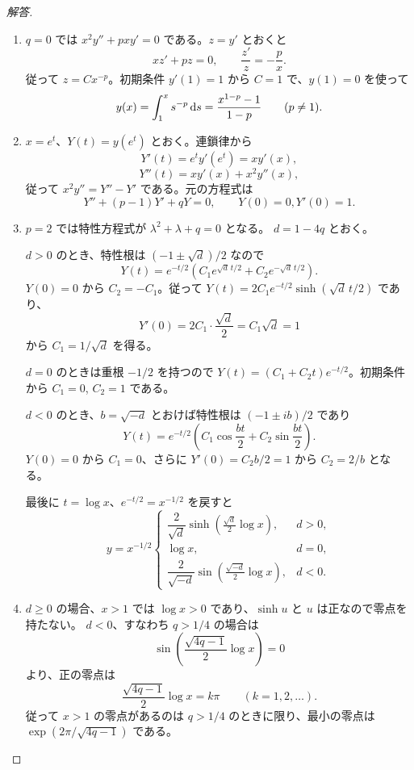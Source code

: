 \begin{proof}[解答]
\begin{enumerate}
\item[(1)] $q=0$ では $x^2y''+pxy'=0$ である。$z=y'$ とおくと
\[
xz'+pz=0,\qquad \frac{z'}z=-\frac px.
\]
従って $z=Cx^{-p}$。初期条件 $y'(1)=1$ から $C=1$ で、$y(1)=0$ を使って
\[
y(x)=\int_1^x s^{-p}\,\mathrm{d} s=\frac{x^{1-p}-1}{1-p}\qquad(p\ne1).
\]

\item[(2)] $x=e^t$、$Y(t)=y(e^t)$ とおく。連鎖律から
\[
Y'(t)=e^ty'(e^t)=xy'(x),
\]
\[
Y''(t)=xy'(x)+x^2y''(x),
\]
従って $x^2y''=Y''-Y'$ である。元の方程式は
\[
Y''+(p-1)Y'+qY=0,\qquad Y(0)=0, Y'(0)=1.
\]
\item[(3)] $p=2$ では特性方程式が $\lambda^2+\lambda+q=0$ となる。
$d=1-4q$ とおく。

$d>0$ のとき、特性根は $(-1\pm\sqrt d)/2$ なので
\[
Y(t)=e^{-t/2}\left(C_1e^{\sqrt d\,t/2}+C_2e^{-\sqrt d\,t/2}\right).
\]
$Y(0)=0$ から $C_2=-C_1$。従って
$Y(t)=2C_1e^{-t/2}\sinh(\sqrt d\,t/2)$ であり、
\[
Y'(0)=2C_1\cdot\frac{\sqrt d}{2}=C_1\sqrt d=1
\]
から $C_1=1/\sqrt d$ を得る。

$d=0$ のときは重根 $-1/2$ を持つので
$Y(t)=(C_1+C_2t)e^{-t/2}$。初期条件から $C_1=0$, $C_2=1$ である。

$d<0$ のとき、$b=\sqrt{-d}$ とおけば特性根は $(-1\pm ib)/2$ であり
\[
Y(t)=e^{-t/2}\left(C_1\cos\frac{bt}{2}+C_2\sin\frac{bt}{2}\right).
\]
$Y(0)=0$ から $C_1=0$、さらに
$Y'(0)=C_2b/2=1$ から $C_2=2/b$ となる。

最後に $t=\log x$、$e^{-t/2}=x^{-1/2}$ を戻すと
\[
y=x^{-1/2}\begin{cases}
\dfrac{2}{\sqrt d}\sinh(\frac{\sqrt d}{2}\log x),&d>0,\\
\log x,&d=0,\\
\dfrac{2}{\sqrt{-d}}\sin(\frac{\sqrt{-d}}2\log x),&d<0.
\end{cases}
\]
\item[(4)] $d\ge0$ の場合、$x>1$ では $\log x>0$ であり、$\sinh u$ と $u$ は正なので零点を持たない。
$d<0$、すなわち $q>1/4$ の場合は
\[
\sin\left(\frac{\sqrt{4q-1}}2\log x\right)=0
\]
より、正の零点は
\[
\frac{\sqrt{4q-1}}2\log x=k\pi\qquad(k=1,2,\ldots).
\]
従って $x>1$ の零点があるのは $q>1/4$ のときに限り、最小の零点は
$\exp(2\pi/\sqrt{4q-1})$ である。
\end{enumerate}
\end{proof}

